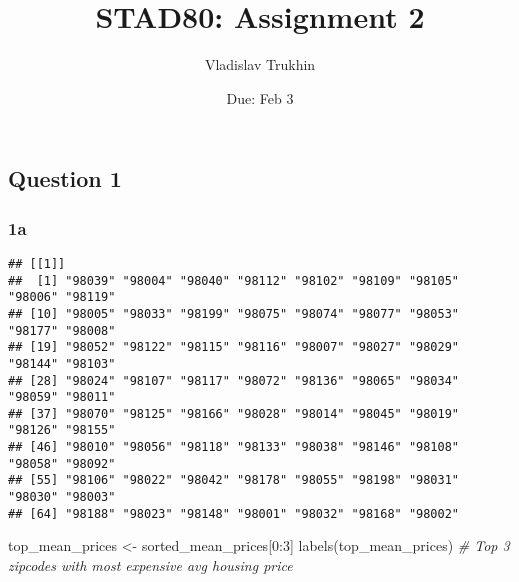 \documentclass[
]{article}
\title{STAD80: Assignment 2}
\author{Vladislav Trukhin}
\date{Due: Feb 3}
\newenvironment{Shaded}{\begin{snugshade}}{\end{snugshade}}
\newcommand{\AttributeTok}[1]{\textcolor[rgb]{0.77,0.63,0.00}{#1}}
\newcommand{\CommentTok}[1]{\textcolor[rgb]{0.56,0.35,0.01}{\textit{#1}}}
\newcommand{\ConstantTok}[1]{\textcolor[rgb]{0.00,0.00,0.00}{#1}}
\newcommand{\DecValTok}[1]{\textcolor[rgb]{0.00,0.00,0.81}{#1}}
\newcommand{\FunctionTok}[1]{\textcolor[rgb]{0.00,0.00,0.00}{#1}}
\newcommand{\NormalTok}[1]{#1}
\newcommand{\OtherTok}[1]{\textcolor[rgb]{0.56,0.35,0.01}{#1}}
\newcommand{\SpecialCharTok}[1]{\textcolor[rgb]{0.00,0.00,0.00}{#1}}
\newcommand{\StringTok}[1]{\textcolor[rgb]{0.31,0.60,0.02}{#1}}
\begin{document}
\maketitle

{
\setcounter{tocdepth}{2}
\tableofcontents
}
\hypertarget{question-1}{%
\subsection{Question 1}\label{question-1}}

\hypertarget{a}{%
\subsubsection{1a}\label{a}}

\begin{Shaded}
\end{Shaded}

\begin{verbatim}
## [[1]]
##  [1] "98039" "98004" "98040" "98112" "98102" "98109" "98105" "98006" "98119"
## [10] "98005" "98033" "98199" "98075" "98074" "98077" "98053" "98177" "98008"
## [19] "98052" "98122" "98115" "98116" "98007" "98027" "98029" "98144" "98103"
## [28] "98024" "98107" "98117" "98072" "98136" "98065" "98034" "98059" "98011"
## [37] "98070" "98125" "98166" "98028" "98014" "98045" "98019" "98126" "98155"
## [46] "98010" "98056" "98118" "98133" "98038" "98146" "98108" "98058" "98092"
## [55] "98106" "98022" "98042" "98178" "98055" "98198" "98031" "98030" "98003"
## [64] "98188" "98023" "98148" "98001" "98032" "98168" "98002"
\end{verbatim}

\begin{Shaded}
\begin{Highlighting}[]
\NormalTok{top\_mean\_prices }\OtherTok{\textless{}{-}}\NormalTok{ sorted\_mean\_prices[}\DecValTok{0}\SpecialCharTok{:}\DecValTok{3}\NormalTok{]}
\FunctionTok{labels}\NormalTok{(top\_mean\_prices) }\CommentTok{\# Top 3 zipcodes with most expensive avg housing price}
\end{Highlighting}
\end{Shaded}
\end{document}
